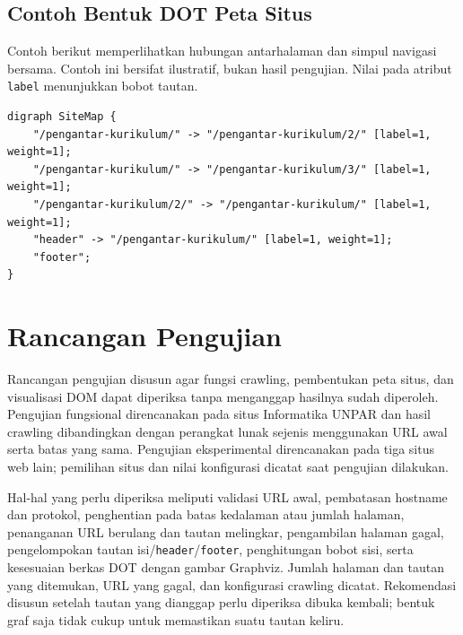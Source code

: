 \subsection{Contoh Bentuk DOT Peta Situs}
Contoh berikut memperlihatkan hubungan antarhalaman dan simpul navigasi bersama. Contoh ini bersifat ilustratif, bukan hasil pengujian. Nilai pada atribut \texttt{label} menunjukkan bobot tautan.

\begin{lstlisting}[caption=Contoh DOT untuk peta situs]
digraph SiteMap {
    "/pengantar-kurikulum/" -> "/pengantar-kurikulum/2/" [label=1, weight=1];
    "/pengantar-kurikulum/" -> "/pengantar-kurikulum/3/" [label=1, weight=1];
    "/pengantar-kurikulum/2/" -> "/pengantar-kurikulum/" [label=1, weight=1];
    "header" -> "/pengantar-kurikulum/" [label=1, weight=1];
    "footer";
}
\end{lstlisting}

\section{Rancangan Pengujian}
Rancangan pengujian disusun agar fungsi crawling, pembentukan peta situs, dan visualisasi DOM dapat diperiksa tanpa menganggap hasilnya sudah diperoleh. Pengujian fungsional direncanakan pada situs Informatika UNPAR dan hasil crawling dibandingkan dengan perangkat lunak sejenis menggunakan URL awal serta batas yang sama. Pengujian eksperimental direncanakan pada tiga situs web lain; pemilihan situs dan nilai konfigurasi dicatat saat pengujian dilakukan.

Hal-hal yang perlu diperiksa meliputi validasi URL awal, pembatasan hostname dan protokol, penghentian pada batas kedalaman atau jumlah halaman, penanganan URL berulang dan tautan melingkar, pengambilan halaman gagal, pengelompokan tautan isi/\texttt{header}/\texttt{footer}, penghitungan bobot sisi, serta kesesuaian berkas DOT dengan gambar Graphviz. Jumlah halaman dan tautan yang ditemukan, URL yang gagal, dan konfigurasi crawling dicatat. Rekomendasi disusun setelah tautan yang dianggap perlu diperiksa dibuka kembali; bentuk graf saja tidak cukup untuk memastikan suatu tautan keliru.
